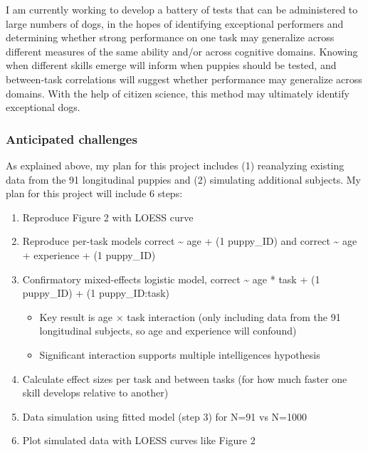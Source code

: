 \documentclass[
  letterpaper,
  DIV=11,
  numbers=noendperiod]{scrartcl}
\providecommand{\tightlist}{%
  \setlength{\itemsep}{0pt}\setlength{\parskip}{0pt}}
\begin{document}
I am currently working to develop a battery of tests that can be
administered to large numbers of dogs, in the hopes of identifying
exceptional performers and determining whether strong performance on one
task may generalize across different measures of the same ability and/or
across cognitive domains. Knowing when different skills emerge will
inform when puppies should be tested, and between-task correlations will
suggest whether performance may generalize across domains. With the help
of citizen science, this method may ultimately identify exceptional
dogs.

\subsubsection{Anticipated challenges}\label{anticipated-challenges}

As explained above, my plan for this project includes (1) reanalyzing
existing data from the 91 longitudinal puppies and (2) simulating
additional subjects. My plan for this project will include 6 steps:

\begin{enumerate}
\def\labelenumi{\arabic{enumi}.}
\tightlist
\item
  Reproduce Figure 2 with LOESS curve
\item
  Reproduce per-task models correct \textasciitilde{} age + (1
  \textbar{} puppy\_ID) and correct \textasciitilde{} age + experience +
  (1 \textbar{} puppy\_ID)
\item
  Confirmatory mixed-effects logistic model, correct \textasciitilde{}
  age * task + (1 \textbar{} puppy\_ID) + (1 \textbar{} puppy\_ID:task)

  \begin{itemize}
  \tightlist
  \item
    Key result is age × task interaction (only including data from the
    91 longitudinal subjects, so age and experience will confound)
  \item
    Significant interaction supports multiple intelligences hypothesis
  \end{itemize}
\item
  Calculate effect sizes per task and between tasks (for how much faster
  one skill develops relative to another)
\item
  Data simulation using fitted model (step 3) for N=91 vs N=1000
\item
  Plot simulated data with LOESS curves like Figure 2
\end{enumerate}
\end{document}
